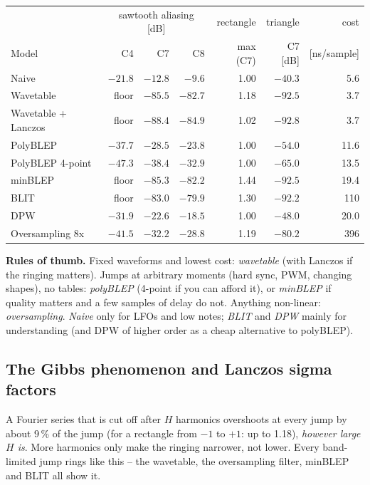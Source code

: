 \documentclass[11pt]{article}
\begin{document}
\begin{center}
\small
\begin{tabular}{lrrrrrr}
\toprule
 & \multicolumn{3}{c}{sawtooth aliasing [dB]} & rectangle & triangle & cost \\
Model & C4 & C7 & C8 & max (C7) & C7 [dB] & [ns/sample] \\
\midrule
Naive               & $-21.8$ & $-12.8$ & $-9.6$  & 1.00 & $-40.3$ & 5.6 \\
Wavetable           & floor   & $-85.5$ & $-82.7$ & 1.18 & $-92.5$ & 3.7 \\
Wavetable + Lanczos & floor   & $-88.4$ & $-84.9$ & 1.02 & $-92.8$ & 3.7 \\
PolyBLEP            & $-37.7$ & $-28.5$ & $-23.8$ & 1.00 & $-54.0$ & 11.6 \\
PolyBLEP 4-point    & $-47.3$ & $-38.4$ & $-32.9$ & 1.00 & $-65.0$ & 13.5 \\
minBLEP             & floor   & $-85.3$ & $-82.2$ & 1.44 & $-92.5$ & 19.4 \\
BLIT                & floor   & $-83.0$ & $-79.9$ & 1.30 & $-92.2$ & 110 \\
DPW                 & $-31.9$ & $-22.6$ & $-18.5$ & 1.00 & $-48.0$ & 20.0 \\
Oversampling 8x     & $-41.5$ & $-32.2$ & $-28.8$ & 1.19 & $-80.2$ & 396 \\
\bottomrule
\end{tabular}
\end{center}

\textbf{Rules of thumb.}
Fixed waveforms and lowest cost: \emph{wavetable} (with Lanczos if the ringing matters).
Jumps at arbitrary moments (hard sync, PWM, changing shapes), no tables: \emph{polyBLEP} (4-point if you can
afford it), or \emph{minBLEP} if quality matters and a few samples of delay do not.
Anything non-linear: \emph{oversampling}.
\emph{Naive} only for LFOs and low notes; \emph{BLIT} and \emph{DPW} mainly for understanding (and DPW of higher
order as a cheap alternative to polyBLEP).

\subsection{The Gibbs phenomenon and Lanczos sigma factors}\label{sec:gibbs}
A Fourier series that is cut off after $H$ harmonics overshoots at every jump by about 9\,\% of the jump
(for a rectangle from $-1$ to $+1$: up to 1.18), \emph{however large $H$ is}. More harmonics only make the
ringing narrower, not lower. Every band-limited jump rings like this -- the wavetable, the oversampling
filter, minBLEP and BLIT all show it.
\end{document}
